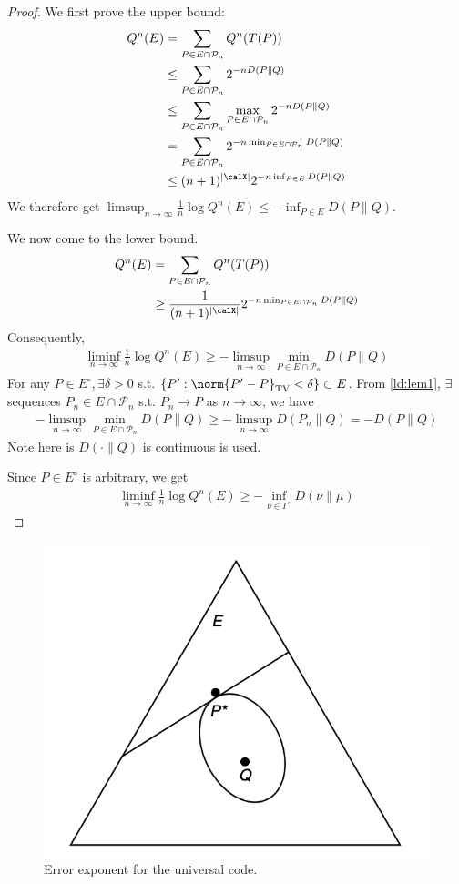 \documentclass{article}
\newcommand{\TV}[1]{\norm{#1}_{\textnormal{TV}}}
\newcommand{\typss}{\mathcal{P}_n}
\begin{document}
\begin{proof}
 We first prove the upper bound:
\begin{align*}
Q^{n}(E) &=\sum_{P \in E \cap \typss} Q^{n}(T(P)) \\
& \leq \sum_{P \in E \cap \typss} 2^{-n D(P \| Q)}\\
&\leq \sum_{P \in E \cap \typss} \max _{P \in E \cap \typss} 2^{-n D(P \| Q)} \\
&=\sum_{P \in E \cap \typss} 2^{-n \min _{P \in E \cap \typss} D(P \| Q)} \\
&\leq(n+1)^{| \calX |} 2^{-n \inf _{P \in E} D(P \| Q)} 
\end{align*}
We therefore get $\limsup _{n \rightarrow \infty} \frac{1}{n} \log Q^n\left( E\right) \leq-\inf _{P \in E} D(P \| Q)$.

We now come to the lower bound.
\begin{align*}
\begin{aligned}
Q^{n}(E) &=\sum_{P \in E \cap \typss} Q^{n}(T(P)) \\
& \geq \frac{1}{(n+1)^{| \calX |}} 2^{-n \min_{P\in E\cap \typss}D\left(P\| Q\right)}
\end{aligned}
\end{align*}
Consequently,
\begin{align*}
\liminf _{n \rightarrow \infty} \frac{1}{n} \log Q^n\left(E\right) \geq-\limsup _{n \rightarrow \infty} \min_{P\in E\cap \typss} D(P \| Q)
\end{align*}
For any $P\in E^{\circ}, \exists \delta>0$ s.t. $\left\{P': \TV{P'-P}<\delta\right\} \subset E$. 
From \cref{ld:lem1}, $\exists$ sequences $P_{n} \in E\cap \typss$ s.t. $P_{n} \rightarrow P$ as $n \rightarrow \infty$, we have
\begin{align*} 
-\limsup _{n \rightarrow \infty} \min_{P\in E\cap \typss} D(P \| Q)\geq-\limsup _{n \rightarrow \infty} D\left(P_{n} \| Q\right)=-D(P \| Q)
\end{align*}
Note here is $D(\cdot \| Q)$ is continuous is used. 

Since $P \in E^{\circ}$ is arbitrary, we get
\begin{align*}
\liminf _{n \rightarrow \infty} \frac{1}{n} \log Q^n\left(E\right)  \geq-\inf _{\nu \in \Gamma^{\circ}} D(\nu \| \mu)
\end{align*}
\end{proof}


\begin{figure}[ht]
 \centering
 \includegraphics[width=0.5\linewidth]{Figs/fig3.png}
\centering
\caption{Error exponent for the universal code.}
		\label{ld:fig1}
\end{figure}
\end{document}
